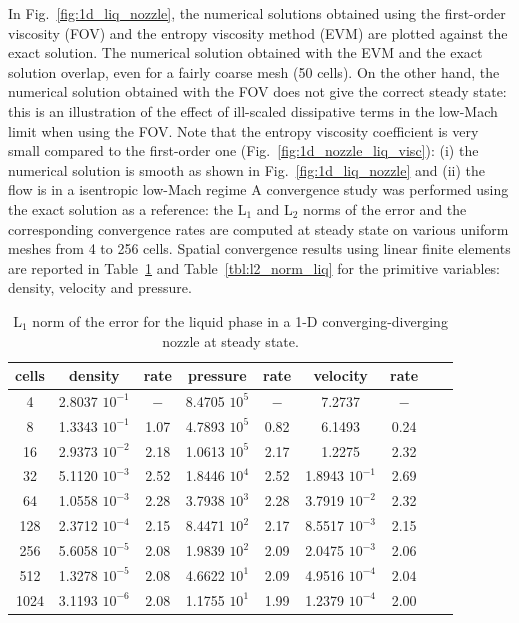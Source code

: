 \documentclass[review,10pt]{elsarticle}
\newcommand{\fig}[1]{Fig.~\ref{#1}}                      %
\newcommand{\tbl}[1]{Table~\ref{#1}}                     %
\begin{document}
%
In \fig{fig:1d_liq_nozzle}, the numerical solutions obtained using the first-order viscosity (FOV) and the entropy 
viscosity method (EVM) are plotted against the exact solution. The numerical solution obtained with the EVM and the 
exact solution overlap, even for a fairly coarse mesh (50 cells).
On the other hand, the numerical solution obtained with the FOV does not give the correct steady state: this is an 
illustration of the effect of ill-scaled dissipative terms in the low-Mach limit when using the FOV.
%
Note that the entropy viscosity coefficient is very small compared to the first-order one (\fig{fig:1d_nozzle_liq_visc}): 
(i) the numerical solution is smooth as shown in \fig{fig:1d_liq_nozzle} and (ii) the flow is in a isentropic low-Mach regime 
A convergence study was performed using the exact solution as a reference: the L$_1$ and L$_2$ norms of the 
error and the corresponding convergence rates are computed at steady state on various uniform meshes from 4 to 256 cells.
Spatial convergence results using linear finite elements are reported in \tbl{tbl:l1_norm_liq} and \tbl{tbl:l2_norm_liq} 
for the primitive variables: density, velocity and pressure.
%
\begin{table}[H]
\begin{center}
 \caption{\label{tbl:l1_norm_liq} L$_1$ norm of the error for the liquid phase in a 1-D converging-diverging nozzle at steady state.}
 \begin{tabular}{|c|c|c|c|c|c|c|c|c|}
 \hline
cells & density         & rate   & pressure        & rate    & velocity         & rate     \\ \hline
4    & 2.8037 $10^{-1}$ & $-$    & 8.4705 $10^{5}$ & $-$     & 7.2737           & $-$      \\ \hline
8    & 1.3343 $10^{-1}$ & 1.07 & 4.7893 $10^{5}$ & 0.82 & 6.1493           & 0.24 \\ \hline
16   & 2.9373 $10^{-2}$ & 2.18 & 1.0613 $10^{5}$ & 2.17  & 1.2275           & 2.32   \\ \hline
32   & 5.1120 $10^{-3}$ & 2.52 & 1.8446 $10^{4}$ & 2.52  & 1.8943 $10^{-1}$ & 2.69   \\ \hline
64   & 1.0558 $10^{-3}$ & 2.28 & 3.7938 $10^{3}$ & 2.28  & 3.7919 $10^{-2}$ & 2.32   \\ \hline
128  & 2.3712 $10^{-4}$ & 2.15 & 8.4471 $10^{2}$ & 2.17  & 8.5517 $10^{-3}$ & 2.15   \\ \hline
256  & 5.6058 $10^{-5}$ & 2.08 & 1.9839 $10^{2}$ & 2.09  & 2.0475 $10^{-3}$ & 2.06   \\ \hline
512  & 1.3278 $10^{-5}$ & $2.08$ & 4.6622 $10^{1}$ & 2.09  & 4.9516 $10^{-4}$ & $2.04$   \\ \hline
1024  & 3.1193 $10^{-6}$ & $2.08$ & 1.1755 $10^{1}$ & 1.99  & 1.2379 $10^{-4}$ & 2.00   \\ \hline
\end{tabular}
\end{center}
\end{table}
\end{document}
